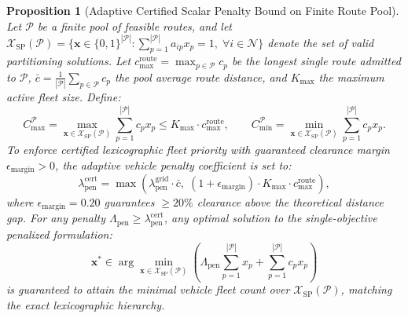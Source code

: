 \documentclass{article}
\newtheorem{proposition}{Proposition}
\begin{document}
\begin{proposition}[Adaptive Certified Scalar Penalty Bound on Finite Route Pool]
Let $\mathcal{P}$ be a finite pool of feasible routes, and let $\mathcal{X}_{\text{SP}}(\mathcal{P}) = \{\mathbf{x} \in \{0, 1\}^{|\mathcal{P}|} : \sum_{p=1}^{|\mathcal{P}|} a_{ip} x_p = 1, \; \forall i \in \mathcal{N}\}$ denote the set of valid partitioning solutions. Let $c_{\max}^{\text{route}} = \max_{p \in \mathcal{P}} c_p$ be the longest single route admitted to $\mathcal{P}$, $\bar{c} = \frac{1}{|\mathcal{P}|}\sum_{p \in \mathcal{P}} c_p$ the pool average route distance, and $K_{\max}$ the maximum active fleet size. Define:
\begin{equation}
C_{\max}^{\mathcal{P}} = \max_{\mathbf{x} \in \mathcal{X}_{\text{SP}}(\mathcal{P})} \sum_{p=1}^{|\mathcal{P}|} c_p x_p \le K_{\max} \cdot c_{\max}^{\text{route}}, \qquad C_{\min}^{\mathcal{P}} = \min_{\mathbf{x} \in \mathcal{X}_{\text{SP}}(\mathcal{P})} \sum_{p=1}^{|\mathcal{P}|} c_p x_p.
\end{equation}
To enforce certified lexicographic fleet priority with guaranteed clearance margin $\epsilon_{\text{margin}} > 0$, the adaptive vehicle penalty coefficient is set to:
\begin{equation}
\lambda_{\text{pen}}^{\text{cert}} = \max\left( \lambda_{\text{pen}}^{\text{grid}} \cdot \bar{c}, \; (1 + \epsilon_{\text{margin}}) \cdot K_{\max} \cdot c_{\max}^{\text{route}} \right),
\label{eq:adaptive_lambda_supp}
\end{equation}
where $\epsilon_{\text{margin}} = 0.20$ guarantees $\ge 20\%$ clearance above the theoretical distance gap. For any penalty $\Lambda_{\text{pen}} \ge \lambda_{\text{pen}}^{\text{cert}}$, any optimal solution to the single-objective penalized formulation:
\begin{equation}
\mathbf{x}^* \in \arg\min_{\mathbf{x} \in \mathcal{X}_{\text{SP}}(\mathcal{P})} \left( \Lambda_{\text{pen}} \sum_{p=1}^{|\mathcal{P}|} x_p + \sum_{p=1}^{|\mathcal{P}|} c_p x_p \right)
\end{equation}
is guaranteed to attain the minimal vehicle fleet count over $\mathcal{X}_{\text{SP}}(\mathcal{P})$, matching the exact lexicographic hierarchy.
\end{proposition}
\end{document}
